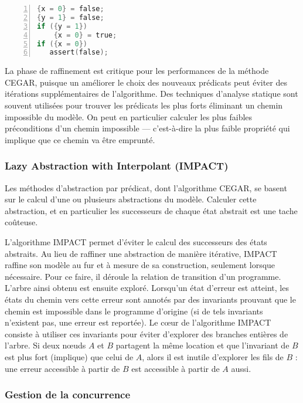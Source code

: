\begin{minipage}{.45\textwidth}
\begin{lstlisting}[language=C, label=lst:CEGAR_3, numbers=left, frame=single,
  caption=Second raffinement]
{x = 0} = false;
{y = 1} = false;
if ({y = 1})
    {x = 0} = true;
if ({x = 0})
   assert(false);
\end{lstlisting}
\end{minipage}

La phase de raffinement est critique pour les performances de la méthode
\ac{CEGAR}, puisque un améliorer le choix des nouveaux prédicats peut éviter des
itérations supplémentaires de l'algorithme. Des techniques d'analyse statique
sont souvent utilisées pour trouver les prédicats les plus forts éliminant un
chemin impossible du modèle. On peut en particulier calculer les plus faibles
préconditions d'un chemin impossible --- c'est-à-dire la plus faible propriété
qui implique que ce chemin va être emprunté.

\subsubsection{Lazy Abstraction with Interpolant (IMPACT)}

Les méthodes d'abstraction par prédicat, dont l'algorithme \ac{CEGAR}, se basent sur
le calcul d'une ou plusieurs abstractions du modèle. Calculer cette abstraction,
et en particulier les successeurs de chaque état abstrait est une tache
coûteuse.

L'algorithme IMPACT\cite{IMPACT} permet d'éviter le calcul des successeurs des
états abstraits. Au lieu de raffiner une abstraction de manière itérative,
IMPACT raffine son modèle au fur et à mesure de sa construction, seulement
lorsque nécessaire. Pour ce faire, il déroule la relation de transition d'un
programme. L'arbre ainsi obtenu est ensuite exploré. Lorsqu'un état d'erreur
est atteint, les états du chemin vers cette erreur sont annotés par des invariants
prouvant que le chemin est impossible dans le programme d'origine (si de tels
invariants n'existent pas, une erreur est reportée). Le cœur de l'algorithme
IMPACT consiste à utiliser ces invariants pour éviter d'explorer des branches
entières de l'arbre. Si deux nœuds \(A\) et \(B\) partagent la même location et
que l'invariant de \(B\) est plus fort (implique) que celui de \(A\), alors il
est inutile d'explorer les fils de \(B\) : une erreur accessible à partir de
\(B\) est accessible à partir de \(A\) aussi.

\subsubsection{Gestion de la concurrence}

